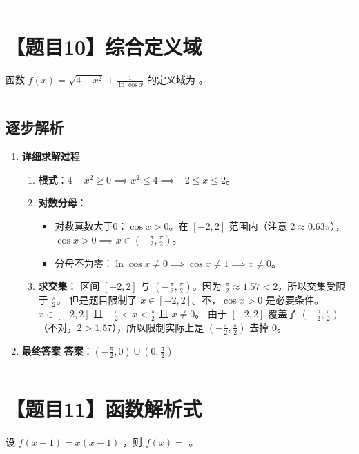 \documentclass[UTF8]{ctexart}
\newenvironment{redenv}{\color{red}}{}
\newenvironment{detailedanalysis}{%
    \color{red}
    \begin{enumerate}[label=\textbf{第\arabic*步：}, leftmargin=*, align=left, itemsep=1.5ex]
}{%
    \end{enumerate}
}
\newcommand{\problemrule}{\noindent\rule{\textwidth}{1.5pt}\vspace{-0.8em}}
\newcommand{\analysisrule}{\noindent\rule{\textwidth}{0.8pt}\vspace{-0.8em}}
\newcommand{\blank}[1]{\underline{\hspace{#1}}}
\begin{document}
\problemrule
\section*{【题目10】综合定义域}
函数 $ f(x) = \sqrt{4 - x^{2}} + \frac{1}{\ln \cos x} $ 的定义域为 \blank{2cm}。

\begin{redenv}
\analysisrule
\subsection*{逐步解析}

\begin{detailedanalysis}
\item \textbf{详细求解过程}
\begin{enumerate}[label=(\arabic*)]
\item \textbf{根式}：$4 - x^2 \ge 0 \implies x^2 \le 4 \implies -2 \le x \le 2$。
\item \textbf{对数分母}：
\begin{itemize}
\item 对数真数大于0：$\cos x > 0$。在 $[-2, 2]$ 范围内（注意 $2 \approx 0.63\pi$），$\cos x > 0 \implies x \in (-\frac{\pi}{2}, \frac{\pi}{2})$。
\item 分母不为零：$\ln \cos x \neq 0 \implies \cos x \neq 1 \implies x \neq 0$。
\end{itemize}
\item \textbf{求交集}：
区间 $[-2, 2]$ 与 $(-\frac{\pi}{2}, \frac{\pi}{2})$。因为 $\frac{\pi}{2} \approx 1.57 < 2$，所以交集受限于 $\frac{\pi}{2}$。
但是题目限制了 $x \in [-2, 2]$。不，$\cos x > 0$ 是必要条件。
$x \in [-2, 2]$ 且 $-\frac{\pi}{2} < x < \frac{\pi}{2}$ 且 $x \neq 0$。
由于 $[-2, 2]$ 覆盖了 $(-\frac{\pi}{2}, \frac{\pi}{2})$（不对，$2 > 1.57$），所以限制实际上是 $(-\frac{\pi}{2}, \frac{\pi}{2})$ 去掉 $0$。
\end{enumerate}

\item \textbf{最终答案}
\textbf{答案}：$ (-\frac{\pi}{2}, 0) \cup (0, \frac{\pi}{2}) $
\end{detailedanalysis}
\end{redenv}

\problemrule
\section*{【题目11】函数解析式}
设 $ f(x-1)=x(x-1) $ ，则 $ f(x)= $ \blank{2cm}。
\end{document}

